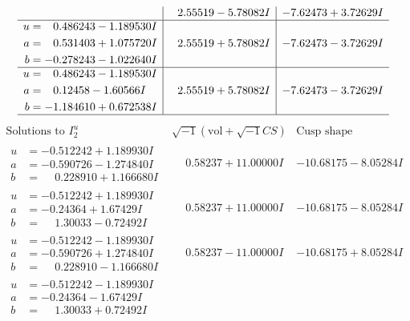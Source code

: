 \documentclass[1p]{elsarticle_modified}
\theoremstyle{definition}
\newcommand{\I}{\sqrt{-1}}
\begin{document}
$$\begin{array}{c|c|c}
 & \phantom{-}2.55519 - 5.78082 I & -7.62473 + 3.72629 I \\ \hline\begin{aligned}
u &= \phantom{-}0.486243 - 1.189530 I \\
a &= \phantom{-}0.531403 + 1.075720 I \\
b &= -0.278243 - 1.022640 I\end{aligned}
 & \phantom{-}2.55519 + 5.78082 I & -7.62473 - 3.72629 I \\ \hline\begin{aligned}
u &= \phantom{-}0.486243 - 1.189530 I \\
a &= \phantom{-}0.12458 - 1.60566 I \\
b &= -1.184610 + 0.672538 I\end{aligned}
 & \phantom{-}2.55519 + 5.78082 I & -7.62473 - 3.72629 I\\
 \hline 
 \end{array}$$\newpage$$\begin{array}{c|c|c}  
\text{Solutions to }I^u_{2}& \I (\text{vol} + \sqrt{-1}CS) & \text{Cusp shape}\\
 \hline 
\begin{aligned}
u &= -0.512242 + 1.189930 I \\
a &= -0.590726 - 1.274840 I \\
b &= \phantom{-}0.228910 + 1.166680 I\end{aligned}
 & \phantom{-}0.58237 + 11.00000 I & -10.68175 - 8.05284 I \\ \hline\begin{aligned}
u &= -0.512242 + 1.189930 I \\
a &= -0.24364 + 1.67429 I \\
b &= \phantom{-}1.30033 - 0.72492 I\end{aligned}
 & \phantom{-}0.58237 + 11.00000 I & -10.68175 - 8.05284 I \\ \hline\begin{aligned}
u &= -0.512242 - 1.189930 I \\
a &= -0.590726 + 1.274840 I \\
b &= \phantom{-}0.228910 - 1.166680 I\end{aligned}
 & \phantom{-}0.58237 - 11.00000 I & -10.68175 + 8.05284 I \\ \hline\begin{aligned}
u &= -0.512242 - 1.189930 I \\
a &= -0.24364 - 1.67429 I \\
b &= \phantom{-}1.30033 + 0.72492 I\end{aligned}

\end{array}$$
\end{document}
